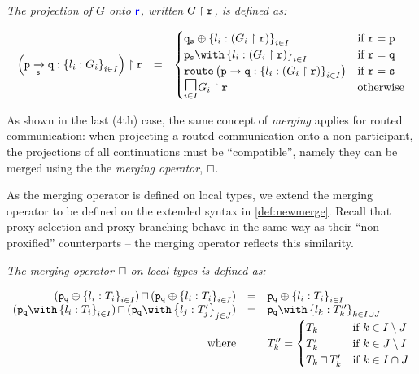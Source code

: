 \begin{definition}[Projection]
\textit{The projection of $G$ onto ${\color{blue}\bm{\mathsf{r}}}$,
written ${G} \upharpoonright {\mathtt{r}}$, is defined as:}

\doublespacing
\[
\begin{array}{>{\displaystyle}rc>{\displaystyle}l}

\proj{
\left(\groute{p}{q}{s}{l_i: G_i}{i \in I}\right)
}{r} & = & 
\begin{cases}
\tselproxy{q}{s}{l_i: (\proj{G_i}{r})}{i \in I}
	& \text{if} ~ \mrole{r} = \mrole{p} \\
\tbraproxy{p}{s}{l_i: (\proj{G_i}{r})}{i \in I}
	& \text{if} ~ \mrole{r} = \mrole{q} \\
\router{p}{q}{l_i: (\proj{G_i}{r})}{i \in I}
	& \text{if} ~ \mrole{r} = \mrole{s} \\
\underset{i \in I}{\MERGEOP}\proj{G_i}{r}
	& \text{otherwise} \\
\end{cases}
\\

\end{array}
\]
\singlespacing

\label{def:newprojection}
\end{definition}

As shown in the last (4th) case, 
the same concept of \textit{merging}
applies for routed communication:
when projecting a routed communication
onto a non-participant, the projections of
all continuations must be ``compatible'',
namely they can be merged using the
the \textit{merging operator}, $\sqcap$.

As the merging operator is defined on local
types, we extend the merging operator to be defined
on the extended syntax in \cref{def:newmerge}.
Recall that proxy selection and proxy
branching behave in the same way as their ``non-proxified''
counterparts -- the merging operator reflects this
similarity.

\begin{definition}
\textit{The merging operator $\sqcap$ on local types is defined as:}

\doublespacing
\[
\begin{array}{rcl}
\tmerge
{(\tselproxy{p}{q}{l_i: T_i}{i \in I})}
{(\tselproxy{p}{q}{l_i: T_i}{i \in I})}
	& = & \tselproxy{p}{q}{l_i: T_i}{i \in I} \\
	
\tmerge
{(\tbraproxy{p}{q}{l_i: T_i}{i \in I})}
{(\tbraproxy{p}{q}{l_j: T'_j}{j \in J})}
	& = & \tbraproxy{p}{q}{l_k: T''_k}{k \in I \cup J} \\
\text{where} & & T''_k = \begin{cases}
T_k & \text{if} ~ k \in I \setminus J \\
T'_k & \text{if} ~ k \in J \setminus I \\
\tmerge{T_k}{T'_k} & \text{if} ~ k \in I \cap J \\
\end{cases} \\
\end{array}
\]
\singlespacing

\label{def:newmerge}
\end{definition}

